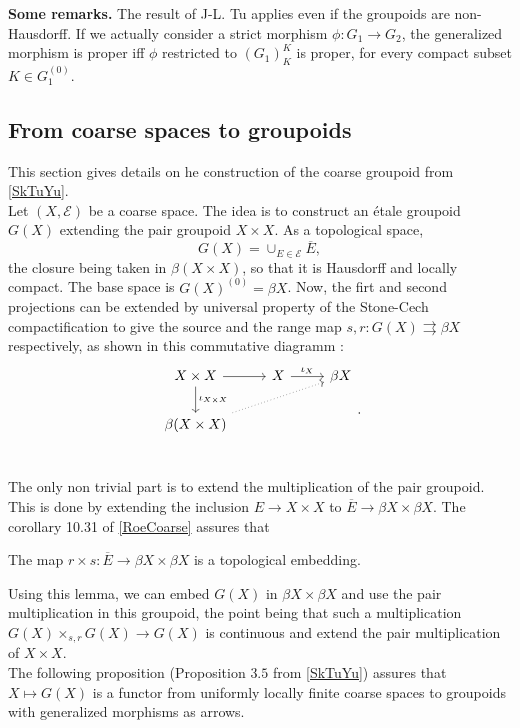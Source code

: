 \textbf{Some remarks.} The result of J-L. Tu applies even if the groupoids are non-Hausdorff. If we actually consider a strict morphism $\phi: G_1 \rightarrow G_2$, the generalized morphism is proper iff $\phi$ restricted to $(G_1)^K_K$ is proper, for every compact subset $K\in G_1^{(0)}$.\\ 

\subsection{From coarse spaces to groupoids}

This section gives details on he construction of the coarse groupoid from \ref{SkTuYu}.\\

Let $(X,\mathcal E)$ be a coarse space. The idea is to construct an étale groupoid $G(X)$ extending the pair groupoid $X\times X$. As a topological space, 
\[G(X)= \cup_{E\in \mathcal E} \overline{E},\]
the closure being taken in $\beta (X\times X)$, so that it is Hausdorff and locally compact. The base space is $G(X)^{(0)}=\beta X$. Now, the firt and second projections can be extended by universal property of the Stone-Cech compactification to give the source and the range map $s,r : G(X)\rightrightarrows \beta X$ respectively, as shown in this commutative diagramm :  
\[\begin{tikzcd}
X\times X \arrow{r}\arrow{d}{\iota_{X\times X}} &  X \arrow{r}{\iota_X} & \beta X \\
\beta (X\times X) \arrow[dotted]{urr} & & \\ 
\end{tikzcd}.\]

The only non trivial part is to extend the multiplication of the pair groupoid. This is done by extending the inclusion $E \rightarrow X\times X$ to $\overline{E} \rightarrow \beta X\times \beta X$. The corollary 10.31 of \ref{RoeCoarse} assures that 
\begin{lem}
The map $r\times s : \overline E \rightarrow \beta X\times \beta X$ is a topological embedding.
\end{lem}
Using this lemma, we can embed $G(X)$ in $\beta X\times \beta X$ and use the pair multiplication in this groupoid, the point being that such a multiplication $G(X)\times_{s,r} G(X) \rightarrow G(X)$ is continuous and extend the pair multiplication of $X\times X$.\\

The following proposition (Proposition $3.5$ from \ref{SkTuYu}) assures that $X\mapsto G(X)$ is a functor from uniformly locally finite coarse spaces to groupoids with generalized morphisms as arrows.\\

